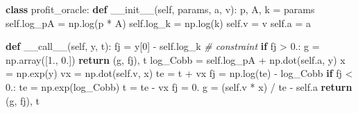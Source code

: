 \documentclass[
  ignorenonframetext,
  aspectratio=169,
  serif,onlymath]{beamer}
\newenvironment{Shaded}{}{}
\newcommand{\CommentTok}[1]{\textcolor[rgb]{0.38,0.63,0.69}{\textit{#1}}}
\newcommand{\ControlFlowTok}[1]{\textcolor[rgb]{0.00,0.44,0.13}{\textbf{#1}}}
\newcommand{\DecValTok}[1]{\textcolor[rgb]{0.25,0.63,0.44}{#1}}
\newcommand{\FloatTok}[1]{\textcolor[rgb]{0.25,0.63,0.44}{#1}}
\newcommand{\FunctionTok}[1]{\textcolor[rgb]{0.02,0.16,0.49}{#1}}
\newcommand{\KeywordTok}[1]{\textcolor[rgb]{0.00,0.44,0.13}{\textbf{#1}}}
\newcommand{\NormalTok}[1]{#1}
\newcommand{\OperatorTok}[1]{\textcolor[rgb]{0.40,0.40,0.40}{#1}}
\newcommand{\VariableTok}[1]{\textcolor[rgb]{0.10,0.09,0.49}{#1}}
\begin{document}
\begin{frame}[fragile]

\scriptsize

\begin{Shaded}
\begin{Highlighting}[]
\KeywordTok{class}\NormalTok{ profit_oracle:}
    \KeywordTok{def} \FunctionTok{__init__}\NormalTok{(}\VariableTok{self}\NormalTok{, params, a, v):}
\NormalTok{        p, A, k }\OperatorTok{=}\NormalTok{ params}
        \VariableTok{self}\NormalTok{.log_pA }\OperatorTok{=}\NormalTok{ np.log(p }\OperatorTok{*}\NormalTok{ A)}
        \VariableTok{self}\NormalTok{.log_k }\OperatorTok{=}\NormalTok{ np.log(k)}
        \VariableTok{self}\NormalTok{.v }\OperatorTok{=}\NormalTok{ v}
        \VariableTok{self}\NormalTok{.a }\OperatorTok{=}\NormalTok{ a}

    \KeywordTok{def} \FunctionTok{__call__}\NormalTok{(}\VariableTok{self}\NormalTok{, y, t):}
\NormalTok{        fj }\OperatorTok{=}\NormalTok{ y[}\DecValTok{0}\NormalTok{] }\OperatorTok{-} \VariableTok{self}\NormalTok{.log_k  }\CommentTok{# constraint}
        \ControlFlowTok{if}\NormalTok{ fj }\OperatorTok{>} \FloatTok{0.}\NormalTok{:}
\NormalTok{            g }\OperatorTok{=}\NormalTok{ np.array([}\FloatTok{1.}\NormalTok{, }\FloatTok{0.}\NormalTok{])}
            \ControlFlowTok{return}\NormalTok{ (g, fj), t}
\NormalTok{        log_Cobb }\OperatorTok{=} \VariableTok{self}\NormalTok{.log_pA }\OperatorTok{+}\NormalTok{ np.dot(}\VariableTok{self}\NormalTok{.a, y)}
\NormalTok{        x }\OperatorTok{=}\NormalTok{ np.exp(y)}
\NormalTok{        vx }\OperatorTok{=}\NormalTok{ np.dot(}\VariableTok{self}\NormalTok{.v, x)}
\NormalTok{        te }\OperatorTok{=}\NormalTok{ t }\OperatorTok{+}\NormalTok{ vx}
\NormalTok{        fj }\OperatorTok{=}\NormalTok{ np.log(te) }\OperatorTok{-}\NormalTok{ log_Cobb}
        \ControlFlowTok{if}\NormalTok{ fj }\OperatorTok{<} \FloatTok{0.}\NormalTok{:}
\NormalTok{            te }\OperatorTok{=}\NormalTok{ np.exp(log_Cobb)}
\NormalTok{            t }\OperatorTok{=}\NormalTok{ te }\OperatorTok{-}\NormalTok{ vx}
\NormalTok{            fj }\OperatorTok{=} \FloatTok{0.}
\NormalTok{        g }\OperatorTok{=}\NormalTok{ (}\VariableTok{self}\NormalTok{.v }\OperatorTok{*}\NormalTok{ x) }\OperatorTok{/}\NormalTok{ te }\OperatorTok{-} \VariableTok{self}\NormalTok{.a}
        \ControlFlowTok{return}\NormalTok{ (g, fj), t}
\end{Highlighting}
\end{Shaded}

\end{frame}
\end{document}

